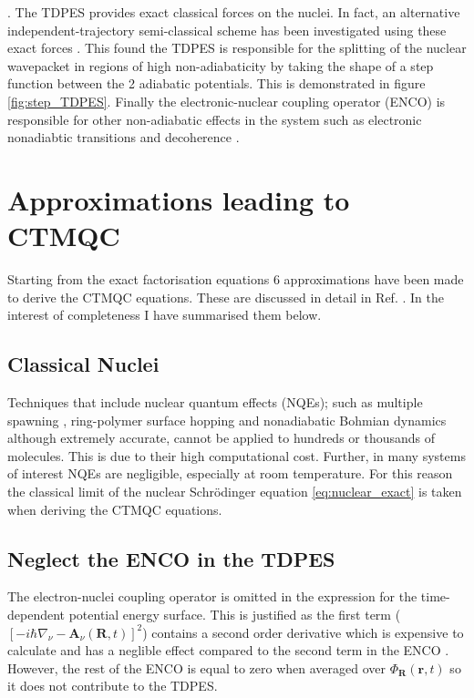 \cite{agostini_semiclassical_2015}.  The TDPES provides exact classical forces on the nuclei. In fact, an alternative independent-trajectory semi-classical scheme has been investigated using these exact forces \cite{agostini_exact_2015}. This found the TDPES is responsible for the splitting of the nuclear wavepacket in regions of high non-adiabaticity by taking the shape of a step function between the 2 adiabatic potentials. This is demonstrated in figure \ref{fig:step_TDPES}. Finally the electronic-nuclear coupling operator (ENCO) is responsible for other non-adiabatic effects in the system such as electronic nonadiabtic transitions and decoherence \cite{agostini_semiclassical_2015}.
\section{Approximations leading to CTMQC}
Starting from the exact factorisation equations 6 approximations have been made to derive the CTMQC equations. These are discussed in detail in Ref. \cite{agostini_quantum-classical_2016}. In the interest of completeness I have summarised them below.
\subsection{Classical Nuclei}
Techniques that include nuclear quantum effects (NQEs); such as multiple spawning \cite{Martnnez*2005Oct}, ring-polymer surface hopping \cite{Shakib2017Jul} and nonadiabatic Bohmian dynamics \cite{Curchod2011Feb, Tavernelli2013Apr} although extremely accurate, cannot be applied to hundreds or thousands of molecules. This is due to their high computational cost. Further, in many systems of interest NQEs are negligible, especially at room temperature. For this reason the classical limit of the nuclear Schr\"odinger equation \eqref{eq:nuclear_exact} is taken when deriving the CTMQC equations.
\subsection{Neglect the ENCO in the TDPES}
The electron-nuclei coupling operator is omitted in the expression for the time-dependent potential energy surface. This is justified as the first term ($\left[-i \hbar \nabla_{\nu} - \textbf{A}_{\nu}(\textbf{R}, t) \right]^2$) contains a second order derivative which is expensive to calculate and has a neglible effect compared to the second term in the ENCO \cite{Scherrer2015Aug}. However, the rest of the ENCO is equal to zero when averaged over $\Phi_{\textbf{R}}(\textbf{r},t)$ so it does not contribute to the TDPES.
